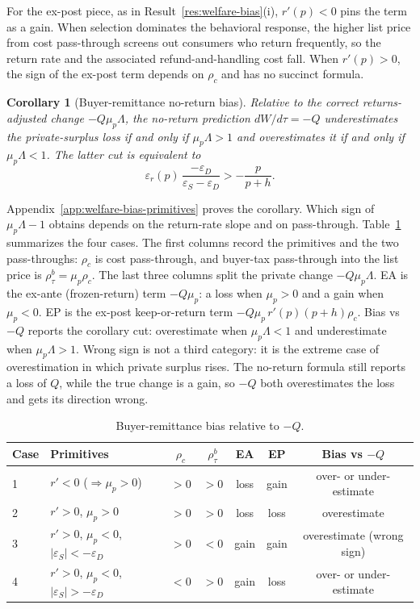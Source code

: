 \documentclass[11pt]{article}
\newtheorem{corollary}{Corollary}
\begin{document}
For the ex-post piece, as in Result~\ref{res:welfare-bias}(i), $r'(p)<0$
pins the term as a gain.  When selection dominates the behavioral response, the
higher list price from cost pass-through screens out consumers who return
frequently, so the return rate and the associated refund-and-handling cost
fall.  When $r'(p)>0$, the sign of the ex-post term depends on $\rho_c$ and
has no succinct formula.
\begin{corollary}[Buyer-remittance no-return bias]
\label{cor:welfare-bias-buyer}
  Relative to the correct returns-adjusted change $-Q\mu_p\Lambda$, the
  no-return prediction $dW/d\tau=-Q$ underestimates the private-surplus loss
  if and only if $\mu_p\Lambda>1$ and overestimates it if and only if
  $\mu_p\Lambda<1$.  The latter cut is equivalent to
  \begin{equation}
    \varepsilon_r(p)\,
    \frac{-\varepsilon_D}{\varepsilon_S-\varepsilon_D}
    >
    -\frac{p}{p+h}.
    \label{eq:V-buyer-cut}
  \end{equation}
\end{corollary}
Appendix~\ref{app:welfare-bias-primitives} proves the corollary.
Which sign of $\mu_p\Lambda-1$ obtains depends on the return-rate slope
and on pass-through.  Table~\ref{tab:buyer-bias-cases} summarizes the four
cases.  The first columns record the primitives and the two pass-throughs:
$\rho_c$ is cost pass-through, and buyer-tax pass-through into the list
price is $\rho^b_\tau=\mu_p\rho_c$.  The last three columns split the private
change $-Q\mu_p\Lambda$.  EA is the ex-ante (frozen-return) term $-Q\mu_p$: a
loss when $\mu_p>0$ and a gain when $\mu_p<0$.  EP is the ex-post keep-or-return
term $-Q\mu_p\,r'(p)(p+h)\rho_c$.  Bias vs $-Q$ reports the corollary cut:
overestimate when $\mu_p\Lambda<1$ and underestimate when $\mu_p\Lambda>1$.
Wrong sign is not a third category: it is the extreme case of overestimation
in which private surplus rises.  The no-return formula still reports a loss
of $Q$, while the true change is a gain, so $-Q$ both overestimates the loss
and gets its direction wrong.
\begin{table}[htbp]
\centering
\begin{tabular}{llccccc}
\hline
Case & Primitives & $\rho_c$ & $\rho^b_\tau$ & EA & EP & Bias vs $-Q$ \\
\hline
1 & $r'<0$ ($\Rightarrow\mu_p>0$) & $>0$ & $>0$ &
  loss & gain & over- or under-estimate \\
2 & $r'>0$, $\mu_p>0$ & $>0$ & $>0$ &
  loss & loss & overestimate \\
3 & $r'>0$, $\mu_p<0$, $|\varepsilon_S|<-\varepsilon_D$ & $>0$ & $<0$ &
  gain & gain & overestimate (wrong sign) \\
4 & $r'>0$, $\mu_p<0$, $|\varepsilon_S|>-\varepsilon_D$ & $<0$ & $>0$ &
  gain & loss & over- or under-estimate \\
\hline
\end{tabular}
\caption{Buyer-remittance bias relative to $-Q$.}
\label{tab:buyer-bias-cases}
\end{table}
\end{document}
